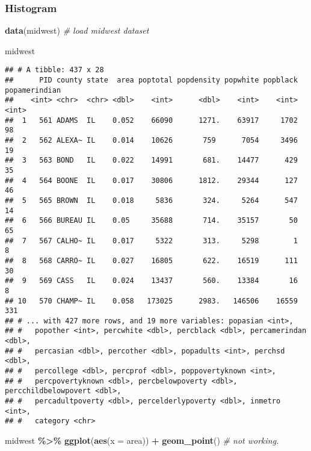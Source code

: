 \documentclass[
]{book}
\newenvironment{Shaded}{\begin{snugshade}}{\end{snugshade}}
\newcommand{\CommentTok}[1]{\textcolor[rgb]{0.56,0.35,0.01}{\textit{#1}}}
\newcommand{\DataTypeTok}[1]{\textcolor[rgb]{0.13,0.29,0.53}{#1}}
\newcommand{\KeywordTok}[1]{\textcolor[rgb]{0.13,0.29,0.53}{\textbf{#1}}}
\newcommand{\NormalTok}[1]{#1}
\newcommand{\OperatorTok}[1]{\textcolor[rgb]{0.81,0.36,0.00}{\textbf{#1}}}
\newcommand{\StringTok}[1]{\textcolor[rgb]{0.31,0.60,0.02}{#1}}
\begin{document}
\hypertarget{histogram}{%
\subsubsection{Histogram}\label{histogram}}

\begin{Shaded}
\begin{Highlighting}[]
\KeywordTok{data}\NormalTok{(midwest) }\CommentTok{\# load midwest dataset}

\NormalTok{midwest}
\end{Highlighting}
\end{Shaded}

\begin{verbatim}
## # A tibble: 437 x 28
##      PID county state  area poptotal popdensity popwhite popblack popamerindian
##    <int> <chr>  <chr> <dbl>    <int>      <dbl>    <int>    <int>         <int>
##  1   561 ADAMS  IL    0.052    66090      1271.    63917     1702            98
##  2   562 ALEXA~ IL    0.014    10626       759      7054     3496            19
##  3   563 BOND   IL    0.022    14991       681.    14477      429            35
##  4   564 BOONE  IL    0.017    30806      1812.    29344      127            46
##  5   565 BROWN  IL    0.018     5836       324.     5264      547            14
##  6   566 BUREAU IL    0.05     35688       714.    35157       50            65
##  7   567 CALHO~ IL    0.017     5322       313.     5298        1             8
##  8   568 CARRO~ IL    0.027    16805       622.    16519      111            30
##  9   569 CASS   IL    0.024    13437       560.    13384       16             8
## 10   570 CHAMP~ IL    0.058   173025      2983.   146506    16559           331
## # ... with 427 more rows, and 19 more variables: popasian <int>,
## #   popother <int>, percwhite <dbl>, percblack <dbl>, percamerindan <dbl>,
## #   percasian <dbl>, percother <dbl>, popadults <int>, perchsd <dbl>,
## #   percollege <dbl>, percprof <dbl>, poppovertyknown <int>,
## #   percpovertyknown <dbl>, percbelowpoverty <dbl>, percchildbelowpovert <dbl>,
## #   percadultpoverty <dbl>, percelderlypoverty <dbl>, inmetro <int>,
## #   category <chr>
\end{verbatim}

\begin{Shaded}
\begin{Highlighting}[]
\NormalTok{midwest }\OperatorTok{\%\textgreater{}\%}
\StringTok{  }\KeywordTok{ggplot}\NormalTok{(}\KeywordTok{aes}\NormalTok{(}\DataTypeTok{x =}\NormalTok{ area)) }\OperatorTok{+}
\StringTok{  }\KeywordTok{geom\_point}\NormalTok{() }\CommentTok{\# not working.}
\end{Highlighting}
\end{Shaded}
\end{document}
